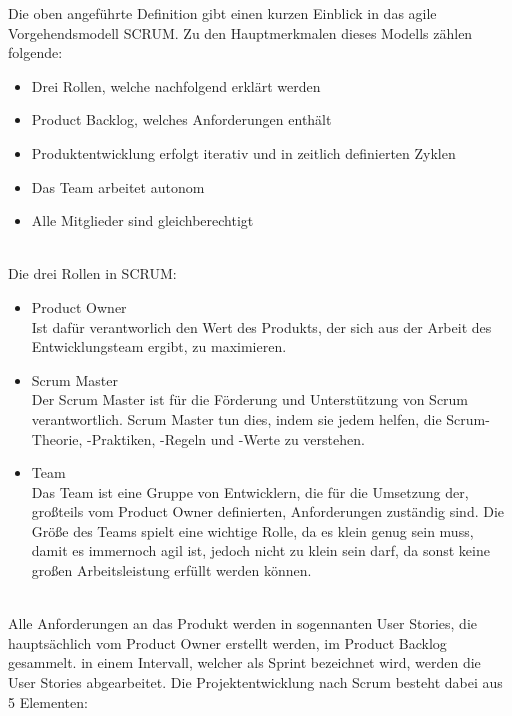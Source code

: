 \noindent Die oben angeführte Definition gibt einen kurzen Einblick in das agile Vorgehendsmodell
SCRUM. Zu den Hauptmerkmalen dieses Modells zählen folgende:
\begin{itemize}
    \item Drei Rollen, welche nachfolgend erklärt werden
    \item Product Backlog, welches Anforderungen enthält
    \item Produktentwicklung erfolgt iterativ und in zeitlich definierten Zyklen
    \item Das Team arbeitet autonom
    \item Alle Mitglieder sind gleichberechtigt
\end{itemize}
\\
\noindent Die drei Rollen in SCRUM:
\begin{itemize}
    \item Product Owner \\
    Ist dafür verantworlich den Wert des Produkts, der sich aus der Arbeit des Entwicklungsteam
    ergibt, zu maximieren.
    \item Scrum Master \\
    Der Scrum Master ist für die Förderung und Unterstützung von Scrum verantwortlich. Scrum
    Master tun dies, indem sie jedem helfen, die Scrum-Theorie, -Praktiken, -Regeln und
    -Werte zu verstehen.
    \item Team \\
    Das Team ist eine Gruppe von Entwicklern, die für die Umsetzung der, großteils vom
    Product Owner definierten, Anforderungen zuständig sind. Die Größe des Teams spielt eine
    wichtige Rolle, da es klein genug sein muss, damit es immernoch agil ist, jedoch nicht
    zu klein sein darf, da sonst keine großen Arbeitsleistung erfüllt werden können.
\end{itemize}
\\
\noindent Alle Anforderungen an das Produkt werden in sogennanten User Stories, die hauptsächlich
vom Product Owner erstellt werden, im Product Backlog gesammelt. in einem Intervall, welcher
als Sprint bezeichnet wird, werden die User Stories abgearbeitet. Die Projektentwicklung
nach Scrum besteht dabei aus 5 Elementen:
